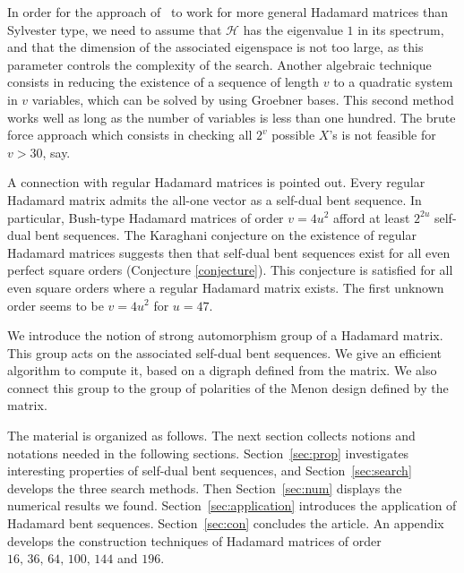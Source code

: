 \documentclass[12pt]{article}
\begin{document}
In order for the approach of~\cite{CDPS:2010} to work for more general Hadamard matrices than Sylvester type, we need to assume that $\mathcal{H}$ has the eigenvalue  $1$ in its spectrum, and that the dimension of the associated eigenspace
is not too large, as this parameter controls the complexity of the search. Another algebraic technique consists in reducing the existence
of a sequence of length $v$ to a quadratic system in $v$ variables, which can be solved by using Groebner bases. This second method works well as long as the number of variables is less than one hundred.
The brute force approach which consists in checking all $2^v$ possible $X$'s is not feasible for $v>30$, say.

A connection with regular Hadamard matrices is pointed out. Every regular Hadamard matrix admits the all-one vector as a self-dual bent sequence.
In particular,  Bush-type Hadamard matrices of order $v=4u^2$ afford at least $2^{2u}$ self-dual bent sequences. The Karaghani conjecture \cite{Kharaghani:2000:twin} on the existence of regular Hadamard matrices
suggests then that self-dual bent
sequences exist for all even perfect square orders (Conjecture \ref{conjecture}). This conjecture is satisfied for all even square orders where a regular Hadamard matrix exists. The first unknown order seems
to be $v=4u^2$ for $u=47.$

We introduce the notion of strong automorphism group of a Hadamard matrix. This group acts on the associated self-dual bent sequences. We give an efficient
algorithm to compute it, based on a digraph defined from the matrix. We also connect this group
to the group of polarities of the Menon design defined by the matrix.

The material is organized as follows. The next section collects notions and notations needed in the following sections. Section~\ref{sec:prop} investigates interesting properties of self-dual bent sequences, and Section~\ref{sec:search} develops the three search methods. Then Section~\ref{sec:num}
displays the numerical results we found. Section~\ref{sec:application} introduces the application of Hadamard bent sequences. Section~\ref{sec:con} concludes the article. An appendix develops the construction techniques of Hadamard matrices of order $16,\,36,\,64,\,100,\,144$ and $196$.
\end{document}

